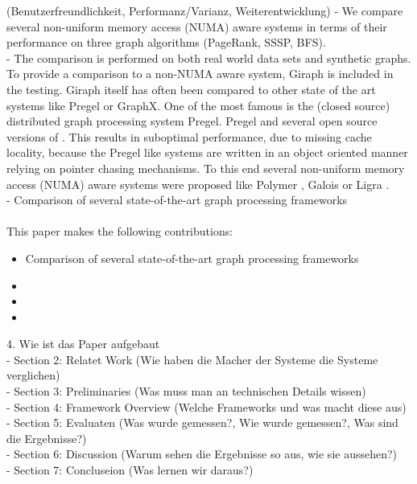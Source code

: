 (Benutzerfreundlichkeit, Performanz/Varianz, Weiterentwicklung)
- We compare several non-uniform memory access (NUMA) aware systems in terms of their performance on three graph algorithms (PageRank, SSSP, BFS).\\
- The comparison is performed on both real world data sets and synthetic graphs.
To provide a comparison to a non-NUMA aware system, Giraph\cite{Giraph} is included in the testing. Giraph itself has often been compared to other state of the art systems like Pregel or GraphX.
One of the most famous is the (closed source) distributed graph processing system Pregel. Pregel and several open source versions of .
This results in suboptimal performance, due to missing cache locality, because the Pregel like systems are written in an object oriented manner relying on pointer chasing mechanisms. To this end several non-uniform memory access (NUMA) aware systems were proposed like Polymer \cite{Polymer}, Galois \cite{Galois} or Ligra \cite{Ligra}.\\
- Comparison of several state-of-the-art graph processing frameworks\\
\\



This paper makes the following contributions:
\begin{itemize}
  \item Comparison of several state-of-the-art graph processing frameworks
  \item 
  \item
  \item
\end{itemize}


4. Wie ist das Paper aufgebaut\\
- Section 2: Relatet Work (Wie haben die Macher der Systeme die Systeme verglichen)\\
- Section 3: Preliminaries (Was muss man an technischen Details wissen)\\
- Section 4: Framework Overview (Welche Frameworks und was macht diese aus)\\
- Section 5: Evaluaten (Was wurde gemessen?, Wie wurde gemessen?, Was sind die Ergebnisse?)\\
- Section 6: Discussion (Warum sehen die Ergebnisse so aus, wie sie aussehen?)\\
- Section 7: Concluseion (Was lernen wir daraus?)\\




